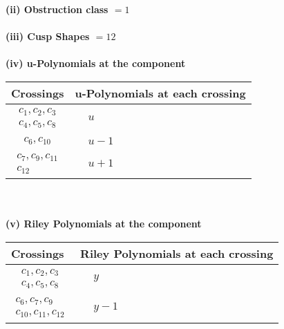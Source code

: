 \documentclass[1p]{elsarticle_modified}
\theoremstyle{definition}
\begin{document}
\flushleft \textbf{(ii) Obstruction class $= 1$}\\~\\
\flushleft \textbf{(iii) Cusp Shapes $= 12$}\\~\\
\newpage\renewcommand{\arraystretch}{1}
\flushleft \textbf{(iv) u-Polynomials at the component}\newline \\
\begin{tabular}{m{50pt}|m{274pt}}
Crossings & \hspace{64pt}u-Polynomials at each crossing \\
\hline $$\begin{aligned}c_{1},c_{2},c_{3}\\c_{4},c_{5},c_{8}\end{aligned}$$&$\begin{aligned}
&u
\end{aligned}$\\
\hline $$\begin{aligned}c_{6},c_{10}\end{aligned}$$&$\begin{aligned}
&u-1
\end{aligned}$\\
\hline $$\begin{aligned}c_{7},c_{9},c_{11}\\c_{12}\end{aligned}$$&$\begin{aligned}
&u+1
\end{aligned}$\\
\hline
\end{tabular}\\~\\
\newpage\renewcommand{\arraystretch}{1}
\flushleft \textbf{(v) Riley Polynomials at the component}\newline \\
\begin{tabular}{m{50pt}|m{274pt}}
Crossings & \hspace{64pt}Riley Polynomials at each crossing \\
\hline $$\begin{aligned}c_{1},c_{2},c_{3}\\c_{4},c_{5},c_{8}\end{aligned}$$&$\begin{aligned}
&y
\end{aligned}$\\
\hline $$\begin{aligned}c_{6},c_{7},c_{9}\\c_{10},c_{11},c_{12}\end{aligned}$$&$\begin{aligned}
&y-1
\end{aligned}$\\
\hline
\end{tabular}\\~\\
\end{document}
